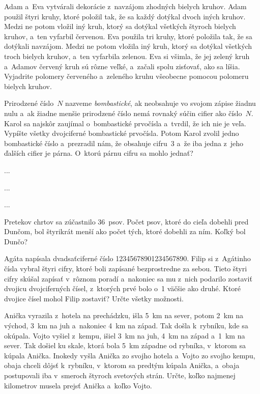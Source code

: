 {%
Adam a~Eva vytvárali dekorácie z~navzájom zhodných bielych kruhov. Adam použil štyri kruhy, ktoré položil tak, že sa každý dotýkal dvoch iných kruhov. Medzi ne potom vložil iný kruh, ktorý sa dotýkal všetkých štyroch bielych kruhov, a~ten vyfarbil červenou. Eva použila tri kruhy, ktoré položila tak, že sa dotýkali navzájom. Medzi ne potom vložila iný kruh, ktorý sa dotýkal všetkých troch bielych kruhov, a~ten vyfarbila zelenou. Eva si všimla, že jej zelený kruh a~Adamov červený kruh sú rôzne veľké, a~začali spolu zisťovať, ako sa líšia. Vyjadrite polomery červeného a~zeleného kruhu všeobecne pomocou polomeru bielych kruhov.
%
}

{%
Prirodzené číslo~$N$ nazveme {\it bombastické}, ak neobsahuje vo svojom zápise žiadnu nulu a~ak žiadne menšie prirodzené číslo nemá rovnaký súčin cifier ako číslo~$N$. Karol sa najskôr zaujímal o~bombastické prvočísla a~tvrdil, že ich nie je veľa. Vypíšte všetky dvojciferné bombastické prvočísla. Potom Karol zvolil jedno bombastické číslo a~prezradil nám, že obsahuje cifru~3 a~že iba jedna z~jeho ďalších cifier je párna. O~ktorú párnu cifru sa mohlo jednať?}

{%
...}

{%
...}

{%
...}

{%
Pretekov chrtov sa zúčastnilo 36~psov.
Počet psov, ktoré do cieľa dobehli pred Dunčom, bol štyrikrát menší ako počet tých, ktoré dobehli za ním.
Koľký bol Dunčo?
}

{%
Agáta napísala dvadsaťciferné číslo 12345678901234567890.
Filip si z~Agátinho čísla vybral štyri cifry, ktoré boli zapísané bezprostredne za sebou.
Tieto štyri cifry skúšal zapísať v~rôznom poradí a~nakoniec sa mu z~nich podarilo zostaviť
dvojicu dvojciferných čísel, z~ktorých prvé bolo o~1 väčšie ako druhé.
Ktoré dvojice čísel mohol Filip zostaviť?
Určte všetky možnosti.}

{%
Anička vyrazila z~hotela na prechádzku, išla 5~km na sever, potom 2~km na východ, 3~km na juh a~nakoniec 4~km na západ.
Tak došla k~rybníku, kde sa okúpala.
Vojto vyšiel z~kempu, išiel 3~km na juh, 4~km na západ a~1~km na sever.
Tak došiel ku skale, ktorá bola 5~km západne od rybníka, v~ktorom sa kúpala Anička.
Inokedy vyšla Anička zo svojho hotela a~Vojto zo svojho kempu, obaja chceli dôjsť k~rybníku, v~ktorom sa predtým kúpala Anička, a~obaja postupovali iba v~smeroch štyroch svetových strán.
Určte, koľko najmenej kilometrov musela prejsť Anička a~koľko Vojto.
\ifobrazkyvedla\else{}\fi%
}

